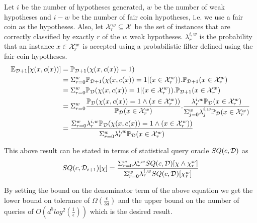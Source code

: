 Let $i$ be the number of hypotheses generated, $w$ be the number of weak hypotheses and $i-w$ be the number of fair coin hypotheses, i.e. we use a fair coin as the hypotheses. Also, let $\mathcal{X}_r^w \subseteq \mathcal{X}$ be the set of instances that are correctly classified by exactly $r$ of the $w$ weak hypotheses. $\lambda_r^{i, w}$ is the probability that an instance $x \in \mathcal{X}_r^w$ is accepted using a probabilistic filter defined using the fair coin hypotheses.
\begin{align*}
\mathbb{E}_{\mathcal{D}+1}[\chi(x, c(x))] &= \mathbb{P}_{\mathcal{D}+1}(\chi(x, c(x)) = 1) \\
&= \Sigma_{r=0}^{w} \mathbb{P}_{\mathcal{D}+1}(\chi(x, c(x)) = 1 | (x \in \mathcal{X}_r^w)).\mathbb{P}_{\mathcal{D}+1}(x \in \mathcal{X}_r^w) \\
&= \Sigma_{r=0}^{w} \mathbb{P}_{\mathcal{D}}(\chi(x, c(x)) = 1 | (x \in \mathcal{X}_r^w)).\mathbb{P}_{\mathcal{D}+1}(x \in \mathcal{X}_r^w) \\
&= \Sigma_{r=0}^{w} \frac{\mathbb{P}_{\mathcal{D}}(\chi(x, c(x)) = 1 \wedge (x \in \mathcal{X}_r^w))}{\mathbb{P}_{\mathcal{D}}(x \in \mathcal{X}_r^w)}.\frac{\lambda_r^{i, w} \mathbb{P}_{\mathcal{D}}(x \in \mathcal{X}_r^w)}{\Sigma_{j=0}^{w} \lambda_j^{i, w} \mathbb{P}_{\mathcal{D}}(x \in \mathcal{X}_r^w)} \\
&= \frac{\Sigma_{r=0}^{w} \lambda_r^{i, w} \mathbb{P}_{\mathcal{D}}(\chi(x, c(x)) = 1 \wedge (x \in \mathcal{X}_r^w))}{\Sigma_{r=0}^{w} \lambda_r^{i, w} \mathbb{P}_{\mathcal{D}}(x \in \mathcal{X}_r^w)}
\end{align*}

This above result can be stated in terms of statistical query oracle $SQ(c, \mathcal{D})$ as
\begin{align*}
SQ(c, \mathcal{D}_{i+1})[\chi] = \frac{\Sigma_{r=0}^{w} \lambda_r^{i, w} SQ(c, \mathcal{D})[\chi \wedge \chi_r^w]}{\Sigma_{r=0}^{w} \lambda_r^{i, w} SQ(c, \mathcal{D})[\chi_r^w]}
\end{align*}

By setting the bound on the denominator term of the above equation we get the lower bound on tolerance of $\Omega\left(\frac{\epsilon}{3d}\right)$ and the upper bound on the number of queries of $O\left(d^5log^2\left(\frac{1}{\epsilon}\right)\right)$ which is the desired result.


